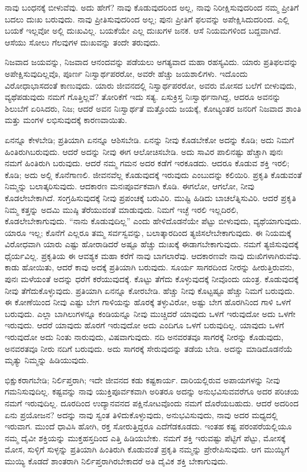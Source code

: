 ನಾವು ಬಂಧನಕ್ಕೆ ಬೀಳುವೆವು. ಅದು ಹೇಗೆ? ನಾವು ಕೊಡುವುದರಿಂದ ಅಲ್ಲ, ನಾವು ನಿರೀಕ್ಷಿಸುವುದರಿಂದ ನಮ್ಮ ಪ್ರೀತಿಗೆ ಬದಲು ದುಃಖ ಬರುವುದು. ನಾವು ಪ್ರೀತಿಸುವುದರಿಂದ ಅಲ್ಲ; ಪುನಃ ಪ್ರೀತಿಗೆ ಫಲವನ್ನು ಅಪೇಕ್ಷಿಸಿದುದರಿಂದ. ಎಲ್ಲಿ ಬಯಕೆ ಇಲ್ಲವೋ ಅಲ್ಲಿ ದುಃಖವಿಲ್ಲ. ಬಯಕೆಯೇ ಎಲ್ಲ ದುಃಖಗಳ ಜನಕ. ಆಸೆ ನಿಯಮಗಳಿಂದ ಬದ್ದವಾಗಿದೆ. ಆಸೆಯು ಸೋಲು ಗೆಲವುಗಳ ದುಃಖವನ್ನು ತಂದೇ ತರುವುದು.

ನಿಜವಾದ ಜಯವನ್ನು, ನಿಜವಾದ ಆನಂದವನ್ನು ಪಡೆಯಲು ಅಗತ್ಯವಾದ ಮಹಾ ರಹಸ್ಯವಿದು. ಯಾರು ಪ್ರತಿಫಲವನ್ನು ಅಪೇಕ್ಷಿಸುವುದಿಲ್ಲವೊ, ಪೂರ್ಣ ನಿಃಸ್ವಾರ್ಥಪರರೋ, ಅವರೇ ಹೆಚ್ಚು ಜಯಶಾಲಿಗಳು. ಇದೊಂದು ವಿರೋಧಾಭಾಸದಂತೆ ಕಾಣುವುದು. ಯಾರು ಜೀವನದಲ್ಲಿ ನಿಸ್ವಾರ್ಥಪರರೋ, ಅವರು ಮೋಸದ ಬಲೆಗೆ ಬೀಳುವುದು, ವ್ಯಥೆಪಡುವುದು ನಮಗೆ ಗೊತ್ತಿಲ್ಲವೆ? ತೋರಿಕೆಗೆ ಇದು ಸತ್ಯ. ಏಸುಕ್ರಿಸ್ತ ನಿಃಸ್ವಾರ್ಥನಾಗಿದ್ದ, ಆದರೂ ಅವನನ್ನು ಶಿಲುಬೆಗೆ ಏರಿಸಿದರು, ನಿಜ; ಆದರೆ ಅವನ ನಿಃಸ್ವಾರ್ಥತೆ ಮತ್ತೊಂದು ಜಯಕ್ಕೆ, ಕೋಟ್ಯಂತರ ಜನರಿಗೆ ನಿಜವಾದ ಶಾಂತಿ ಮತ್ತು ಮಂಗಳ ಲಭಿಸುವುದಕ್ಕೆ ಕಾರಣವಾಯಿತು.

ಏನನ್ನೂ ಕೇಳಬೇಡಿ; ಪ್ರತಿಯಾಗಿ ಏನನ್ನೂ ಆಶಿಸಬೇಡಿ. ಏನನ್ನು ನೀವು ಕೊಡಬೇಕೋ ಅದನ್ನು ಕೊಡಿ; ಅದು ನಿಮಗೆ ಹಿಂತಿರುಗಿಬರುವುದು. ಆದರೆ ಅದನ್ನು ನೀವು ಈಗ ಆಲೋಚಿಸಬೇಡಿ. ಅದು ಸಾವಿರ ಪಾಲಿನಷ್ಟು ಹೆಚ್ಚಾಗಿ ಪುನಃ ನಮಗೆ ಹಿಂತಿರುಗಿ ಬರುವುದು. ಆದರೆ ನಮ್ಮ ಗಮನ ಅದರ ಕಡೆಗೆ ಇರಕೂಡದು. ಆದರೂ ಕೊಡುವ ಶಕ್ತಿ ಇರಲಿ; ಕೊಡಿ; ಅದು ಅಲ್ಲಿ ಕೊನೆಗಾಣಲಿ. ಜೀವನವೆಲ್ಲ ಕೊಡುವುದಕ್ಕೆ ಇರುವುದು ಎಂಬುದನ್ನು ಕಲಿಯಿರಿ. ಪ್ರಕೃತಿ ಕೊಡುವಂತೆ ನಿಮ್ಮನ್ನು ಬಲಾತ್ಕರಿಸುವುದು. ಆದಕಾರಣ ಮನಃಪೂರ್ವಕವಾಗಿ ಕೊಡಿ. ಈಗಲೋ, ಆಗಲೋ, ನೀವು ಕೊಡಲೇಬೇಕಾಗಿದೆ. ಸಂಗ್ರಹಿಸುವುದಕ್ಕೆ ನೀವು ಪ್ರಪಂಚಕ್ಕೆ ಬರುವಿರಿ. ಮುಷ್ಟಿ ಹಿಡಿದು ಬಾಚಲೆತ್ನಿಸುವಿರಿ. ಆದರೆ ಪ್ರಕೃತಿ ನಿಮ್ಮ ಕತ್ತನ್ನು ಅದಮಿ ಮುಷ್ಠಿ ತೆರೆಯುವಂತೆ ಮಾಡುವುದು. ನಿಮಗೆ ಇಚ್ಛೆ ಇರಲಿ ಇಲ್ಲದಿರಲಿ, ಕೊಡಲೇಬೇಕಾಗುವುದು. “ನಾನು ಕೊಡುವುದಿಲ್ಲ” ಎಂದು ಹೇಳಿದೊಡನೆಯೇ ಪೆಟ್ಟು ಬೀಳುವುದು, ವ್ಯಥೆಯಾಗುವುದು. ಯಾರೂ ಇಲ್ಲ; ಕೊನೆಗೆ ಎಲ್ಲರೂ ತಮ್ಮ ಸರ್ವಸ್ವವನ್ನು, ಬಲಾತ್ಕಾರದಿಂದ ತ್ಯಜಿಸಲೇಬೇಕಾಗುವುದು. ಈ ನಿಯಮಕ್ಕೆ ವಿರೋಧವಾಗಿ ಯಾರು ಎಷ್ಟು ಹೋರಾಡಿದರೆ ಅಷ್ಟೂ ಹೆಚ್ಚು ದುಃಖಕ್ಕೆ ಈಡಾಗಬೇಕಾಗುವುದು. ನಮಗೆ ತ್ಯಜಿಸುವುದಕ್ಕೆ ಧೈರ್ಯವಿಲ್ಲ. ಪ್ರಕೃತಿಯ ಈ ಆವಶ್ಯಕ ಮಹಾ ಕರೆಗೆ ನಾವು ಬಾಗಲಾರೆವು. ಆದಕಾರಣವೇ ನಾವು ದುಃಖಿಗಳಾಗಿರುವೆವು. ಕಾಡು ಹೋಯಿತು, ಆದರೆ ಕಾವು ಅದಕ್ಕೆ ಪ್ರತಿಯಾಗಿ ಬರುವುದು. ಸೂರ್ಯ ಸಾಗರದಿಂದ ನೀರನ್ನು ಹೀರುತ್ತಿರುವನು, ಪುನಃ ಮಳೆಯಂತೆ ಅದನ್ನು ಧರೆಗೆ ಕರೆಯುವುದಕ್ಕೆ. ಕೊಟ್ಟು ತೆಗೆದು ಕೊಳ್ಳುವುದಕ್ಕೆ ನೀವೊಂದು ಯಂತ್ರ. ಕೊಡುವುದಕ್ಕೆ ನೀವು ತೆಗೆದುಕೊಳ್ಳುವುದು. ಪ್ರತಿಯಾಗಿ ಏನನ್ನೂ ಕೋರಬೇಡಿ. ಹೆಚ್ಚು ನೀವು ಕೊಟ್ಟಷ್ಟೂ ಹೆಚ್ಚು ನಿಮಗೆ ಬರುವುದು. ಈ ಕೋಣೆಯಿಂದ ನೀವು ಎಷ್ಟು ಬೇಗ ಗಾಳಿಯನ್ನು ಹೊರಕ್ಕೆ ತಳ್ಳುವಿರೋ, ಅಷ್ಟು ಬೇಗ ಹೊರಗಿನಿಂದ ಗಾಳಿ ಒಳಗೆ ಬರುವುದು. ಎಲ್ಲಾ ಬಾಗಿಲುಗಳನ್ನೂ ಕಂಡಿಯನ್ನೂ ನೀವು ಮುಚ್ಚಿದರೆ ಯಾವುದು ಒಳಗೆ ಇರುವುದೋ ಅದು ಒಳಗೇ ಇರುವುದು. ಆದರೆ ಯಾವುದು ಹೊರಗೆ ಇರುವುದೋ ಅದು ಎಂದಿಗೂ ಒಳಗೆ ಬರುವುದಿಲ್ಲ. ಯಾವುದು ಒಳಗೆ ಇರುವುದೋ ಅದು ನಿಂತು ನಾರುವುದು, ವಿಷವಾಗುವುದು. ನದಿ ಅನವರತವೂ ಸಾಗರಕ್ಕೆ ನೀರನ್ನು ಕೊಡುವುದು, ಅನವರತವೂ ನೀರು ನದಿಗೆ ಬರುವುದು. ಅದು ಸಾಗರಕ್ಕೆ ಸೇರುವುದನ್ನು ತಡೆಯ ಬೇಡಿ. ಅದನ್ನು ಮಾಡಿದೊಡನೆಯೆ ಮೃತ್ಯು ನಿಮ್ಮನ್ನು ಹಿಡಿಯುವುದು.

ಭಿಕ್ಷುಕರಾಗಬೇಡಿ; ನಿರ್ಲಿಪ್ತರಾಗಿ; ಇದೇ ಜೀವನದ ಕಡು ಕಷ್ಟಕಾರ್ಯ. ದಾರಿಯಲ್ಲಿರುವ ಅಪಾಯಗಳನ್ನು ನೀವು ಗಮನಿಸುವುದಿಲ್ಲ. ಕಷ್ಟವನ್ನು ನಾವು ಯುಕ್ತಿಪೂರ್ವಕವಾಗಿ ಅರಿತರೂ ಅದನ್ನು ಅನುಭವಿಸುವವರೆಗೂ ಅದರ ಪರಿಚಯ ನಮಗೆ ಇರುವುದಿಲ್ಲ. ದೂರದಿಂದ ಉದ್ಯಾನವನದ ಪಕ್ಷಿನೋಟವೊಂದು ನಮಗೆ ದೊರೆಯಬಹುದು. ಆದರೆ ಅದರಿಂದ ಏನು ಪ್ರಯೋಜನ? ಅದನ್ನು ನಾವು ಸ್ವಂತ ತಿಳಿದುಕೊಳ್ಳುವುದು, ಅನುಭವಿಸುವುದು, ನಾವು ಅದರ ಮಧ್ಯದಲ್ಲಿ ಇರುವಾಗ. ಮುಂದೆ ಧಾವಿಸಿ ಹೋಗಿ, ರಕ್ತ ಸೋರುತ್ತಿದ್ದರೂ ಎದೆಗೆಡಕೂಡದು. ಇಂತಹ ಕಷ್ಟ ಪರಂಪರೆಯಲ್ಲಿಯೂ ನಮ್ಮ ದೈವೀ ಶಕ್ತಿಯನ್ನು ಮುಕ್ತಹಸ್ತದಿಂದ ಎತ್ತಿ ಹಿಡಿಯಬೇಕು. ನಮಗೆ ಶಕ್ತಿ ಇರುವಷ್ಟು ಪೆಟ್ಟಿಗೆ ಪೆಟ್ಟು, ಮೋಸಕ್ಕೆ ಮೋಸ, ಸುಳ್ಳಿಗೆ ಸುಳ್ಳನ್ನು ಪ್ರತಿಯಾಗಿ ಹಿಂತಿರುಗಿ ಕೊಡುವಂತೆ ಪ್ರಕೃತಿ ನಮ್ಮನ್ನು ಪ್ರೇರೇಪಿಸುವುದು. ಆಗ ಮುಯ್ಯಿಗೆ ಮುಯ್ಯಿ ಕೊಡದೆ ಶಾಂತರಾಗಿ ನಿರ್ಲಿಪ್ತರಾಗಿರಬೇಕಾದರೆ ಅತಿ ದೈವಿಕ ಶಕ್ತಿ ಬೇಕಾಗುವುದು.

